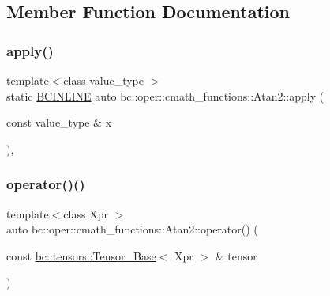 \subsection{Member Function Documentation}
\mbox{\label{structbc_1_1oper_1_1cmath__functions_1_1Atan2_ac24c9f40bb5bf2ff82f22efaf458d43d}} 
\subsubsection{\texorpdfstring{apply()}{apply()}}
{\footnotesize\ttfamily template$<$class value\+\_\+type $>$ \\
static \hyperlink{common_8h_a6699e8b0449da5c0fafb878e59c1d4b1}{B\+C\+I\+N\+L\+I\+NE} auto bc\+::oper\+::cmath\+\_\+functions\+::\+Atan2\+::apply (\begin{DoxyParamCaption}\item[{const value\+\_\+type \&}]{x }\end{DoxyParamCaption})\hspace{0.3cm}{\ttfamily [inline]}, {\ttfamily [static]}}

\mbox{\label{structbc_1_1oper_1_1cmath__functions_1_1Atan2_a03ed6789a0a864f1034ffd6c90e1237c}} 
\subsubsection{\texorpdfstring{operator()()}{operator()()}\hspace{0.1cm}{\footnotesize\ttfamily [1/3]}}
{\footnotesize\ttfamily template$<$class Xpr $>$ \\
auto bc\+::oper\+::cmath\+\_\+functions\+::\+Atan2\+::operator() (\begin{DoxyParamCaption}\item[{const \hyperlink{classbc_1_1tensors_1_1Tensor__Base}{bc\+::tensors\+::\+Tensor\+\_\+\+Base}$<$ Xpr $>$ \&}]{tensor }\end{DoxyParamCaption})\hspace{0.3cm}{\ttfamily [inline]}}

